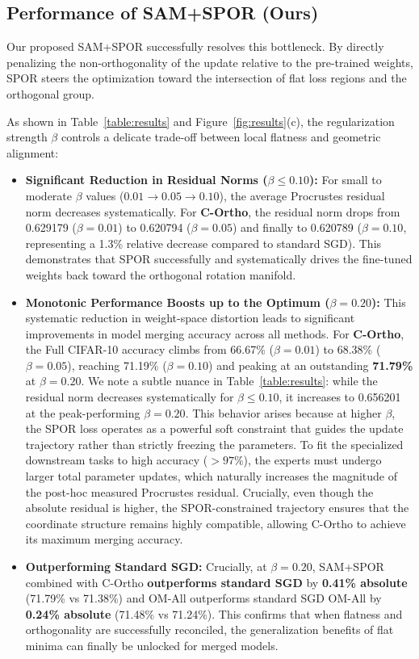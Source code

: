 \documentclass{article}
\theoremstyle{plain}
\theoremstyle{definition}
\theoremstyle{remark}
\begin{document}
\subsection{Performance of SAM+SPOR (Ours)}
Our proposed SAM+SPOR successfully resolves this bottleneck. By directly penalizing the non-orthogonality of the update relative to the pre-trained weights, SPOR steers the optimization toward the intersection of flat loss regions and the orthogonal group.

As shown in Table~\ref{table:results} and Figure~\ref{fig:results}(c), the regularization strength $\beta$ controls a delicate trade-off between local flatness and geometric alignment:
\begin{itemize}
    \item \textbf{Significant Reduction in Residual Norms ($\beta \le 0.10$):} For small to moderate $\beta$ values ($0.01 \to 0.05 \to 0.10$), the average Procrustes residual norm decreases systematically. For \textbf{C-Ortho}, the residual norm drops from 0.629179 ($\beta=0.01$) to 0.620794 ($\beta=0.05$) and finally to 0.620789 ($\beta=0.10$, representing a 1.3\% relative decrease compared to standard SGD). This demonstrates that SPOR successfully and systematically drives the fine-tuned weights back toward the orthogonal rotation manifold.
    \item \textbf{Monotonic Performance Boosts up to the Optimum ($\beta = 0.20$):} This systematic reduction in weight-space distortion leads to significant improvements in model merging accuracy across all methods. For \textbf{C-Ortho}, the Full CIFAR-10 accuracy climbs from 66.67\% ($\beta=0.01$) to 68.38\% ($\beta=0.05$), reaching 71.19\% ($\beta=0.10$) and peaking at an outstanding \textbf{71.79\%} at $\beta=0.20$. We note a subtle nuance in Table~\ref{table:results}: while the residual norm decreases systematically for $\beta \le 0.10$, it increases to 0.656201 at the peak-performing $\beta = 0.20$. This behavior arises because at higher $\beta$, the SPOR loss operates as a powerful soft constraint that guides the update trajectory rather than strictly freezing the parameters. To fit the specialized downstream tasks to high accuracy ($>97\%$), the experts must undergo larger total parameter updates, which naturally increases the magnitude of the post-hoc measured Procrustes residual. Crucially, even though the absolute residual is higher, the SPOR-constrained trajectory ensures that the coordinate structure remains highly compatible, allowing C-Ortho to achieve its maximum merging accuracy.
    \item \textbf{Outperforming Standard SGD:} Crucially, at $\beta=0.20$, SAM+SPOR combined with C-Ortho \textbf{outperforms standard SGD} by \textbf{0.41\% absolute} (71.79\% vs 71.38\%) and OM-All outperforms standard SGD OM-All by \textbf{0.24\% absolute} (71.48\% vs 71.24\%). This confirms that when flatness and orthogonality are successfully reconciled, the generalization benefits of flat minima can finally be unlocked for merged models.

\end{itemize}
\end{document}
